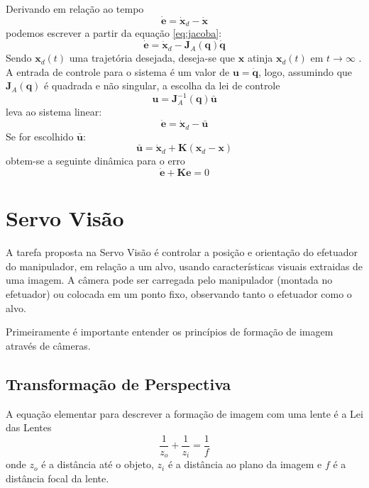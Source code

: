 Derivando em relação ao tempo
\begin{equation}
\bm{\dot{e}} = \bm{\dot{x}}_d - \bm{\dot{x}}
\end{equation}
podemos escrever a partir da equação \ref{eq:jacoba}:
\begin{equation}
\bm{\dot{e}} = \bm{\dot{x}}_d - \bm{J}_A(\bm{q})\dot{\bm{q}}
\end{equation}
Sendo $\bm{x}_d(t)$ uma trajetória desejada, deseja-se que $\bm{x}$ atinja $\bm{x}_d(t)$ em $t \to \infty$ .
A entrada de controle para o sistema é um valor de $\bm{u} = \dot{\bm{q}}$, logo, assumindo que $\bm{J}_A(\bm{q})$ é quadrada e não singular, a escolha da lei de controle
\begin{equation}
\bm{u} = \bm{J}_A^{-1}(\bm{q})\bar{\bm{u}}
\end{equation}
leva ao sistema linear:
\begin{equation}
\dot{\bm{e}} = \dot{\bm{x}}_d - \bar{\bm{u}}
\end{equation}
Se for escolhido $\bar{\bm{u}}$:
\begin{equation}
\bar{\bm{u}} = \dot{\bm{x}}_d + \bm{K} (\bm{x}_d - \bm{x})
\end{equation}
obtem-se a seguinte dinâmica para o erro
\begin{equation}
\dot{\bm{e}} + \bm{K} \bm{e} = 0
\end{equation}

\section{Servo Visão}
A tarefa proposta na Servo Visão é controlar a posição e orientação do efetuador do manipulador, em relação a um alvo, usando características visuais extraidas de uma imagem. A câmera pode ser carregada pelo manipulador (montada no efetuador) ou colocada em um ponto fixo, observando tanto o efetuador como o alvo.

Primeiramente é importante entender os princípios de formação de imagem através de câmeras. 

\subsection{Transformação de Perspectiva}
A equação elementar para descrever a formação de imagem com uma lente é a Lei das Lentes
\begin{equation} 
\frac{1}{z_o} + \frac{1}{z_i} = \frac{1}{f}
\end{equation} 
onde $z_o$ é a distância até o objeto, $z_i$ é a distância ao plano da imagem e $f$ é a distância focal da lente.

